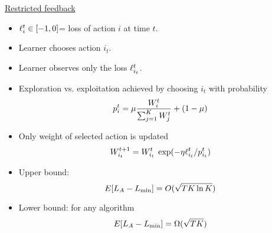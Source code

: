 \begin{flushleft}
\begin{LARGE}
\begin{center}
\underline{Restricted feedback}
\end{center}
\begin{itemize}
\item $\ell_{i}^{t} \in [-1,0]$= loss of action $i$ at time $t$.
\item
Learner chooses action $i_t$.
\item
Learner observes only the loss $\ell_{i_t}^{t}$.
\item
Exploration vs. exploitation achieved by choosing $i_t$ with
probability
\[
p_i^t = \mu  {W_{i}^{t} \over \sum_{j=1}^K W_{j}^{t}}
        + (1-\mu)
\]
\item
Only weight of selected action is updated
\[ 
W_{i_t}^{t+1} = W_{i_t}^{t} \; 
                    \exp (-\eta \ell_{i_t}^{t}/p_{i_t}^t)
\]
\item
Upper bound:
\[
E [L_A - L_{\min}] = O(\sqrt{T K \ln K})
\]
\item
Lower bound: for any algorithm
\[
E [L_A - L_{\min}] = \Omega(\sqrt{T K})
\]
\end{itemize}
\end{LARGE}
\end{flushleft}





\iffalse
\item
Expand the exponent around $p=\btheta$:
\[
\TEloss{\theta}^{T+1}-\BEloss^{T+1} = 
\TEloss{\btheta}^{T+1}-\BEloss^{T+1}
+ \left. {d \over d\theta} \right|_{\theta=\btheta} \TEloss{\theta}^{T+1}
+ \left. {d^2 \over d\theta^2} \right|_{\theta=\btheta} \TEloss{\theta}^{T+1}
+ o((\theta-\btheta)^2)
\]
\item
\[
\int_0^1 \dweight{\theta}{} e^{-\eta (\TEloss{\theta}^{T+1}-\BEloss^{T+1})} d\theta
= \dweight{\btheta}{} 
\]
\fi

